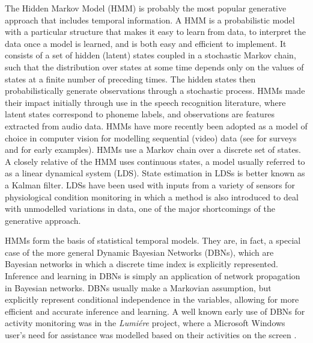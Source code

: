 The Hidden Markov Model (HMM) is probably the most popular generative approach that includes temporal information. A HMM is a probabilistic model with a particular structure that makes it easy to learn from data, to interpret the data once a model is learned, and is both easy and efficient to implement. It consists of a set of hidden (latent) states coupled in a stochastic Markov chain, such that the distribution over states at some time depends only on the values of states at a finite number of preceding times. The hidden states then probabilistically generate observations through a stochastic process. HMMs made their impact initially through use in the speech recognition literature, where latent states correspond to phoneme labels, and observations are features extracted from audio data. HMMs have more recently been adopted as a model of choice in computer vision for modelling sequential (video) data (see \cite{Gavrila1999} \cite{Moeslund2006} for surveys and \cite{Galata1999} \cite{Starner1995} for early examples). HMMs use a Markov chain over a discrete set of states. A closely relative of the HMM uses continuous states, a model usually referred to as a linear dynamical system (LDS). State estimation in LDSs is better known as a Kalman filter. LDSs have been used with inputs from a variety of sensors for physiological condition monitoring \cite{Quinn2009} in which a method is also introduced to deal with unmodelled variations in data, one of the major shortcomings of the generative approach.

HMMs form the basis of statistical temporal models. They are, in fact, a special case of the more general Dynamic Bayesian Networks (DBNs), which are Bayesian networks in which a discrete time index is explicitly represented. Inference and learning in DBNs is simply an application of network propagation in Bayesian networks. DBNs usually make a Markovian assumption, but explicitly represent conditional independence in the variables, allowing for more efficient and accurate inference and learning. A well known early use of DBNs for activity monitoring was in the \textit{Lumi\'ere} project, where a Microsoft Windows user’s need for assistance was modelled based on their activities on the screen \cite{Horvitz1998}.

